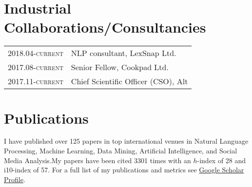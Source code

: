 \documentclass[a4paper,11pt]{article}
\begin{document}
\section{Industrial Collaborations/Consultancies}

\begin{tabular}{r p{11cm}}
\textsc{2018.04-current} & NLP consultant, LexSnap Ltd.\\
\textsc{2017.08-current} & Senior Fellow, Cookpad Ltd. \\
\textsc{2017.11-current} & Chief Scientific Officer (CSO), Alt \\
\end{tabular}


\newpage
\section{Publications}

I have published over 125 papers in top international venues in Natural Language Processing, Machine Learning, Data Mining, Artificial Intelligence, and Social Media Analysis.My papers have been cited 3301 times with an $h$-index of 28 and i10-index of 57.
For a full list of my publications and metrics see \href{https://goo.gl/mnhgp6}{Google Scholar Profile}.



%
\end{document}
